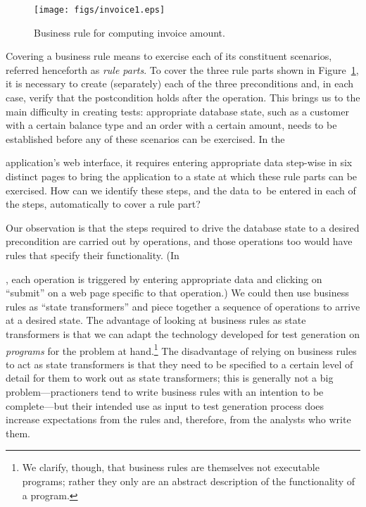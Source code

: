 \begin{figure}
\centering
\texttt{[image: figs/invoice1.eps]}
\vspace*{-18pt}
\caption{Business rule for computing invoice amount.}
\label{fig:invoice}
\end{figure}

Covering a business rule means to exercise each of its constituent scenarios,
referred henceforth as \textit{rule parts}.  To cover the three rule parts shown
in Figure~\ref{fig:invoice}, it is necessary to create (separately) each of the
three preconditions and, in each case, verify that the postcondition holds after
the operation.  This brings us to the main difficulty in creating tests:
appropriate database state, such as a customer with a certain balance type and
an order with a certain amount, needs to be established before any of these
scenarios can be exercised.  In the \subject{jBilling} application's web
interface, it requires entering appropriate data step-wise in six distinct pages
to bring the application to a state at which these rule parts can be exercised.
How can we identify these steps, and the data to~be entered in
each of the steps, automatically to cover a rule part?

Our observation is that the steps required to drive the database state to a
desired precondition are carried out by operations, and those operations too
would have rules that specify their functionality.  (In \subject{jbilling}, each
operation is triggered by entering appropriate data and clicking on ``submit''
on a web page specific to that operation.) We could then use business rules as
``state transformers'' and piece together a sequence of operations to arrive at
a desired state.  The advantage of looking at business rules as state
transformers is that we can adapt the technology developed for test generation
on \textit{programs} for the problem at hand.\footnote{We clarify, though, that
  business rules are themselves not executable programs; rather they only are an
  abstract description of the functionality of a program.}  The disadvantage of
relying on business rules to act as state transformers is that they need to be
specified to a certain level of detail for them to work out as state
transformers; this is generally not a big problem---practioners tend to write
business rules with an intention to be complete---but their intended use as
input to test generation process does increase expectations from the rules and,
therefore, from the analysts who write them.

